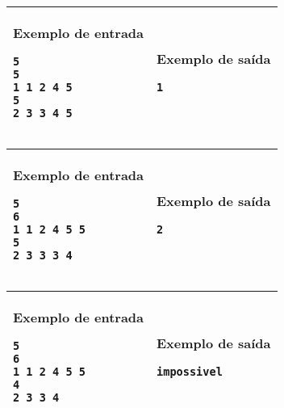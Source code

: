 \newpage
\begin{table}[!h]
\centering
\begin{tabular}{|l|l|}
\hline
\begin{minipage}[t]{3in}
\textbf{Exemplo de entrada}
\begin{verbatim}
5
5
1 1 2 4 5
5
2 3 3 4 5
\end{verbatim}
\vspace{1mm}
\end{minipage}
&
\begin{minipage}[t]{3in}
\textbf{Exemplo de saída}
\begin{verbatim}
1
\end{verbatim}
\vspace{1mm}
\end{minipage} \\
\hline
\end{tabular}
\end{table}

\begin{table}[!h]
\centering
\begin{tabular}{|l|l|}
\hline
\begin{minipage}[t]{3in}
\textbf{Exemplo de entrada}
\begin{verbatim}
5
6
1 1 2 4 5 5
5
2 3 3 3 4
\end{verbatim}
\vspace{1mm}
\end{minipage}
&
\begin{minipage}[t]{3in}
\textbf{Exemplo de saída}
\begin{verbatim}
2
\end{verbatim}
\vspace{1mm}
\end{minipage} \\
\hline
\end{tabular}
\end{table}

\begin{table}[!h]
\centering
\begin{tabular}{|l|l|}
\hline
\begin{minipage}[t]{3in}
\textbf{Exemplo de entrada}
\begin{verbatim}
5
6
1 1 2 4 5 5
4
2 3 3 4
\end{verbatim}
\vspace{1mm}
\end{minipage}
&
\begin{minipage}[t]{3in}
\textbf{Exemplo de saída}
\begin{verbatim}
impossivel
\end{verbatim}
\vspace{1mm}
\end{minipage} \\
\hline
\end{tabular}
\end{table}

